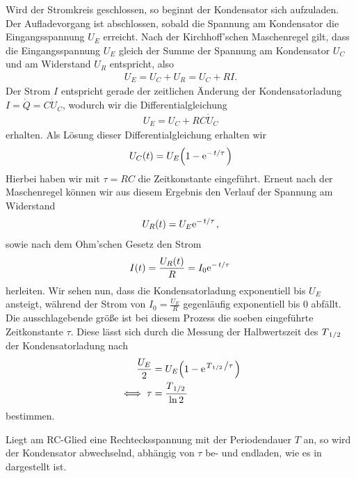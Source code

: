 Wird der Stromkreis geschlossen, so beginnt der Kondensator sich aufzuladen. Der Aufladevorgang ist abschlossen, sobald die Spannung am Kondensator die Eingangsspannung $U_E$ erreicht. Nach der Kirchhoff'schen Maschenregel gilt, dass die Eingangsspannung $U_E$ gleich der Summe der Spannung am Kondensator $U_C$ und am Widerstand $U_R$ entspricht, also
\begin{align}
  U_E = U_C + U_R = U_C + R I.
\end{align}
Der Strom $I$ entspricht gerade der zeitlichen Änderung der Kondensatorladung $I = \dot{Q} = C \dot{U}_C$, wodurch wir die Differentialgleichung
\begin{align}
  U_E = U_C + RC \dot{U}_C
\end{align}
erhalten. Als Lösung dieser Differentialgleichung erhalten wir
\begin{align}
  U_C(t) = U_E\qty(1 - \e{-\flatfrac{t}{\tau}})
\end{align}
Hierbei haben wir mit $\tau = RC$ die Zeitkonstante eingeführt. Erneut nach der Maschenregel können wir aus diesem Ergebnis den Verlauf der Spannung am Widerstand
\begin{align}
  U_R(t) = U_E\e{-\flatfrac{t}{\tau}},
\end{align}
sowie nach dem Ohm'schen Gesetz den Strom
\begin{align}
  I(t) = \frac{U_R(t)}{R} = I_0\e{-\flatfrac{t}{\tau}}
\end{align} 
herleiten. Wir sehen nun, dass die Kondensatorladung exponentiell bis $U_E$ ansteigt, während der Strom von $I_0 = \frac{U_E}{R}$ gegenläufig exponentiell bis $0$ abfällt. Die ausschlagebende größe ist bei diesem Prozess die soeben eingeführte Zeitkonstante $\tau$. Diese lässt sich durch die Messung der Halbwertszeit des $T_{\flatfrac{1}{2}}$ der Kondensatorladung nach 
\begin{align}
  \frac{U_E}{2} &= U_E\qty(1 - \e{\flatfrac{T_{\ffrac{1}{2}}}{\tau}})\\
  \iff \tau &= \frac{\Thalf}{\ln 2}\label{eq:zeitkonst}
\end{align}
bestimmen.

Liegt am RC-Glied eine Rechtecksspannung mit der Periodendauer $T$ an, so wird der Kondensator abwechselnd, abhängig von $\tau$ be- und endladen, wie es in  dargestellt ist.

